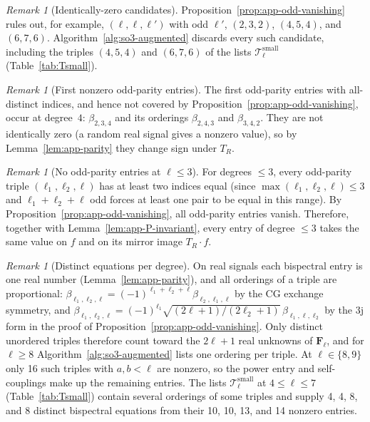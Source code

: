 \documentclass{article}
\theoremstyle{definition}
\theoremstyle{remark}
\newtheorem{remark}[theorem]{Remark}
\theoremstyle{definition}
\begin{document}
\begin{remark}[Identically-zero candidates]
\label{rem:app-Tell-zero-rows}
Proposition~\ref{prop:app-odd-vanishing} rules out, for example,
$(\ell,\ell,\ell')$ with odd $\ell'$, $(2,3,2)$, $(4,5,4)$, and
$(6,7,6)$. Algorithm~\ref{alg:so3-augmented} discards every such
candidate, including the triples $(4,5,4)$ and $(6,7,6)$ of the lists
$\mathcal{T}^{\mathrm{small}}_\ell$ (Table~\ref{tab:Tsmall}).
\end{remark}

\begin{remark}[First nonzero odd-parity entries]\label{cor:app-first-odd}
The first odd-parity entries with all-distinct indices, and hence not
covered by Proposition~\ref{prop:app-odd-vanishing}, occur at
degree~$4$: $\beta_{2,3,4}$ and its orderings $\beta_{2,4,3}$ and
$\beta_{3,4,2}$. They are not identically zero (a random real signal
gives a nonzero value), so by Lemma~\ref{lem:app-parity} they change
sign under $T_R$.
\end{remark}

\begin{remark}[No odd-parity entries at $\ell \le 3$]\label{rem:app-no-parity-breaking-le3}
For degrees $\le 3$, every odd-parity triple $(\ell_1,\ell_2,\ell)$
has at least two indices equal (since $\max(\ell_1,\ell_2,\ell) \le 3$
and $\ell_1+\ell_2+\ell$ odd forces at least one pair to be equal in this range).
By Proposition~\ref{prop:app-odd-vanishing}, all odd-parity entries vanish.
Therefore, together with Lemma~\ref{lem:app-P-invariant}, every entry of degree $\le 3$
takes the same value on $f$ and on its mirror image $T_R\cdot f$.
\end{remark}

\begin{remark}[Distinct equations per degree]
\label{rem:app-Tell-rank-deficit}
On real signals each bispectral entry is one real number
(Lemma~\ref{lem:app-parity}), and all orderings of a triple are
proportional: $\beta_{\ell_1,\ell_2,\ell}
=(-1)^{\ell_1+\ell_2+\ell}\beta_{\ell_2,\ell_1,\ell}$ by the CG
exchange symmetry, and
$\beta_{\ell_1,\ell_2,\ell}=(-1)^{\ell_1}
\sqrt{(2\ell+1)/(2\ell_2+1)}\,\beta_{\ell_1,\ell,\ell_2}$ by the
3j form in the proof of Proposition~\ref{prop:app-odd-vanishing}.
Only distinct unordered triples therefore count toward the $2\ell{+}1$
real unknowns of $\mathbf{F}_\ell$, and for $\ell\ge 8$
Algorithm~\ref{alg:so3-augmented} lists one ordering per triple. At
$\ell\in\{8,9\}$ only 16 such triples with $a,b<\ell$ are nonzero,
so the power entry and self-couplings make up the remaining entries. The lists
$\mathcal{T}^{\mathrm{small}}_\ell$ at $4\le\ell\le 7$ (Table~\ref{tab:Tsmall}) contain several
orderings of some triples and supply 4, 4, 8, and 8 distinct
bispectral equations from their 10, 10, 13, and 14 nonzero entries.
\end{remark}
\end{document}
